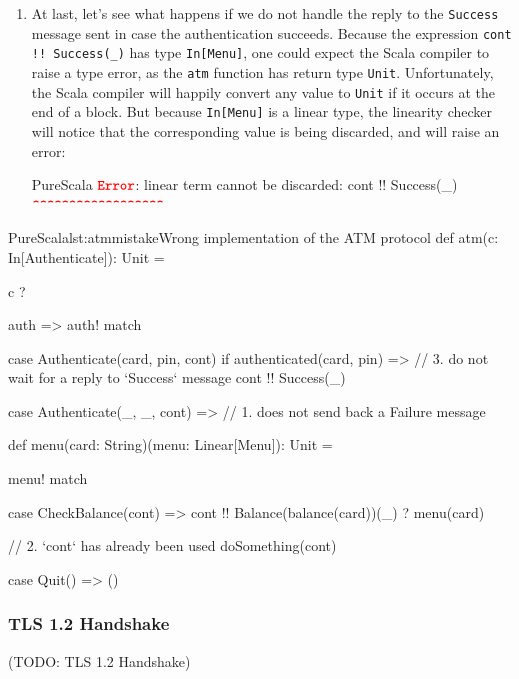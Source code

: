 \documentclass[a4paper,twoside]{article}
\newcommand{\TODO}[1]{\textcolor{YellowOrange}{(TODO: #1)}} %
\newcommand{\stt}[1]{\texttt{\small{#1}}}
\begin{document}
\begin{enumerate}
\item
At last, let's see what happens if we do not handle the reply to the \stt{Success} message sent in case the authentication succeeds. Because the expression \stt{cont !! Success(\_)} has type \stt{In[Menu]}, one could expect the Scala compiler to raise a type error, as the \stt{atm} function has return type \stt{Unit}. Unfortunately, the Scala compiler will happily convert any value to \stt{Unit} if it occurs at the end of a block. But because \stt{In[Menu]} is a linear type, the linearity checker will notice that the corresponding value is being discarded, and will raise an error:

\begin{ShortCode}{PureScala}
$\texttt{\textbf{\textcolor{Red}{Error}}}$: linear term cannot be discarded: cont !! Success(_)
                                        $\texttt{\textbf{\textcolor{Red}{\textasciicircum\textasciicircum\textasciicircum\textasciicircum\textasciicircum\textasciicircum\textasciicircum\textasciicircum\textasciicircum\textasciicircum\textasciicircum\textasciicircum\textasciicircum\textasciicircum\textasciicircum\textasciicircum\textasciicircum\textasciicircum}}}$
\end{ShortCode}
\end{enumerate}

\begin{Code}{PureScala}{lst:atmmistake}{Wrong implementation of the ATM protocol}
def atm(c: In[Authenticate]): Unit = {
  c ? { auth => auth! match {  
    case Authenticate(card, pin, cont) if authenticated(card, pin) =>
      // 3. do not wait for a reply to `Success` message
      cont !! Success(_)
  
    case Authenticate(_, _, cont) =>
      // 1. does not send back a Failure message

  } }
}

def menu(card: String)(menu: Linear[Menu]): Unit = {
  menu! match {
    case CheckBalance(cont) =>
      cont !! Balance(balance(card))(_) ? menu(card)
      
      // 2. `cont` has already been used
      doSomething(cont)

    case Quit() => ()
  }
}
\end{Code}

\subsubsection{TLS 1.2 Handshake}

\TODO{TLS 1.2 Handshake}
\end{document}
